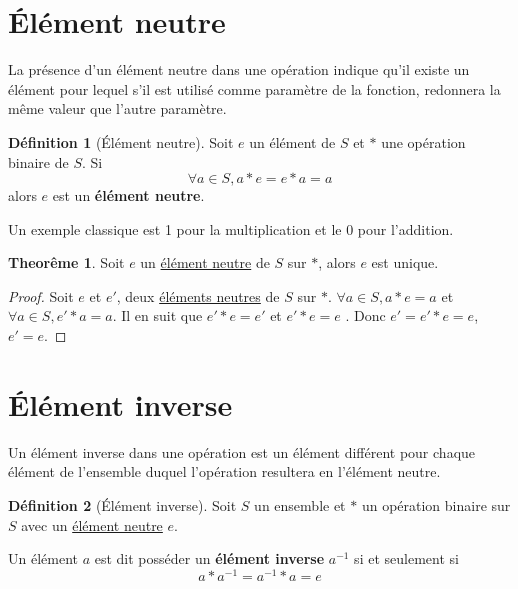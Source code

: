 \documentclass[12pt]{book}
\def\sep{\phantom{}}
\theoremstyle{definition}
\newtheorem{definition}{Définition}[section]
\newtheorem{theorem}{Theorême}[section]
\begin{document}
\section{Élément neutre}
La présence d'un élément neutre dans une opération indique qu'il existe un élément pour lequel s'il est utilisé comme 
paramètre de la fonction, redonnera la même valeur que l'autre paramètre. 

\begin{definition}[Élément neutre]
    \label{def:neutre}
    Soit $e$ un élément de $S$ et $\ast$ une opération binaire de $S$. Si $$\forall a \in S, a \ast e = e \ast a = a$$
    alors $e$ est un \textbf{élément neutre}.
\end{definition}
Un exemple classique est 1 pour la multiplication et le 0 pour l'addition.

\begin{theorem}
    \label{thm:neutre_unique} Soit $e$ un \hyperref[def:neutre]{élément neutre} de $S$ sur $\ast$, alors $e$ est unique.
\end{theorem}

\begin{proof}
    Soit $e$ et $e'$, deux \hyperref[def:neutre]{éléments neutres} de $S$ sur $\ast$. \sep
    $\forall a \in S, a \ast e = a$ \sep et $\forall a \in S, e' \ast a = a$. \sep
    Il en suit que $e' \ast e = e'$ et $e' \ast e = e$ \sep.
    Donc $e' = e' \ast e = e$, $e' = e$.
\end{proof}
\begin{comment}
    On suppose deux éléments neutres différents afin de prouver qu'il n'existe
    qu'une seule valeur possible et qu'en fait, en bout de ligne $e = e'$. \sep 
    On utilise ici la définiton même de ce qu'est un élément neutre pour $e$. \sep 
    Maintenant, on le fait pour $e'$ \sep 
    On utilise le cas particulier de $a = e$ (puisque c'est $\forall a \in S$) et $a = e'$ \sep 
    On en conclut que $e = e'$ et est donc unique.
\end{comment}
\section{Élément inverse}
Un élément inverse dans une opération est un élément différent pour chaque élément de l'ensemble duquel l'opération 
resultera en l'élément neutre.
\begin{definition}[Élément inverse]
    \label{def:inverse}
    Soit $S$ un ensemble et $\ast$ un opération binaire sur $S$ avec un \hyperref[def:neutre]{élément neutre} $e$.

    Un élément $a$ est dit posséder un \textbf{élément inverse} $a^{-1}$ si et seulement si 
    $$ a \ast a^{-1} = a^{-1} \ast a = e $$
\end{definition}
\end{document}
